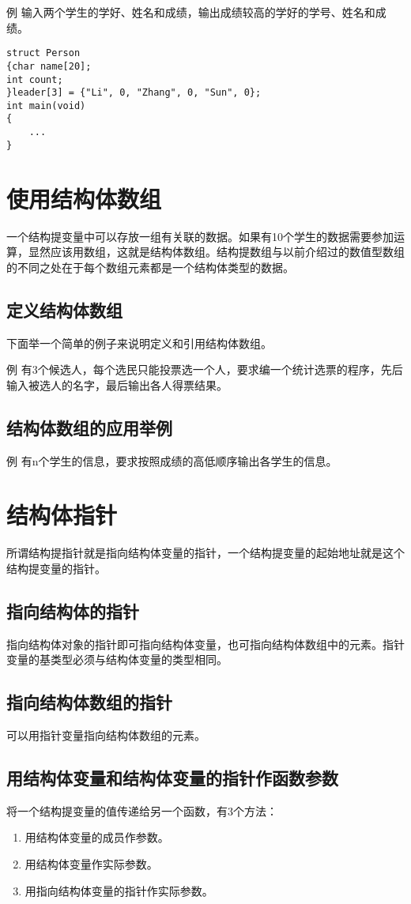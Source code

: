 例 输入两个学生的学好、姓名和成绩，输出成绩较高的学好的学号、姓名和成绩。
\begin{lstlisting}
struct Person
{char name[20];
int count;
}leader[3] = {"Li", 0, "Zhang", 0, "Sun", 0};
int main(void)
{
	...
}
\end{lstlisting}
\section{使用结构体数组}
一个结构提变量中可以存放一组有关联的数据。如果有10个学生的数据需要参加运算，显然应该用数组，这就是结构体数组。结构提数组与以前介绍过的数值型数组的不同之处在于每个数组元素都是一个结构体类型的数据。
\subsection{定义结构体数组}
下面举一个简单的例子来说明定义和引用结构体数组。

例 有3个候选人，每个选民只能投票选一个人，要求编一个统计选票的程序，先后输入被选人的名字，最后输出各人得票结果。
\subsection{结构体数组的应用举例}
例 有n个学生的信息，要求按照成绩的高低顺序输出各学生的信息。
\section{结构体指针}
所谓结构提指针就是指向结构体变量的指针，一个结构提变量的起始地址就是这个结构提变量的指针。
\subsection{指向结构体的指针}
指向结构体对象的指针即可指向结构体变量，也可指向结构体数组中的元素。指针变量的基类型必须与结构体变量的类型相同。
\subsection{指向结构体数组的指针}
可以用指针变量指向结构体数组的元素。
\subsection{用结构体变量和结构体变量的指针作函数参数}
将一个结构提变量的值传递给另一个函数，有3个方法：
\begin{enumerate}
	\item 用结构体变量的成员作参数。
	\item 用结构体变量作实际参数。
	\item 用指向结构体变量的指针作实际参数。
\end{enumerate}
